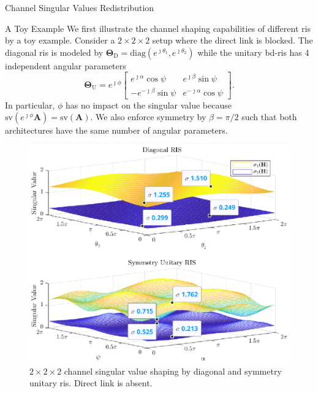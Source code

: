 \documentclass[journal]{IEEEtran}
\begin{document}
\begin{section}{Channel Singular Values Redistribution}
	\begin{subsection}{A Toy Example}
		We first illustrate the channel shaping capabilities of different \gls{ris} by a toy example.
		Consider a $2 \times 2 \times 2$ setup where the direct link is blocked.
		The diagonal \gls{ris} is modeled by $\mathbf{\Theta}_\mathrm{D} = \mathrm{diag}(e^{\jmath \theta_1}, e^{\jmath \theta_2})$ while the unitary \gls{bd}-\gls{ris} has 4 independent angular parameters
		\begin{equation}
			\mathbf{\Theta}_\mathrm{U} = e^{\jmath \phi} \begin{bmatrix}
				e^{\jmath \alpha} \cos \psi  & e^{\jmath \beta} \sin \psi   \\
				-e^{-\jmath \beta} \sin \psi & e^{-\jmath \alpha} \cos \psi
			\end{bmatrix}.
		\end{equation}
		In particular, $\phi$ has no impact on the singular value because $\mathrm{sv}(e^{\jmath \phi} \mathbf{A}) = \mathrm{sv}(\mathbf{A})$.
		We also enforce symmetry by $\beta = \pi / 2$ such that both architectures have the same number of angular parameters.
		\begin{figure}
			\centering
			\includegraphics[width=\columnwidth]{assets/simulation/pc_singular_toy.eps}
			\caption{$2 \times 2 \times 2$ channel singular value shaping by diagonal and symmetry unitary \gls{ris}. Direct link is absent.}

\end{figure}
\end{subsection}
\end{section}
\end{document}
